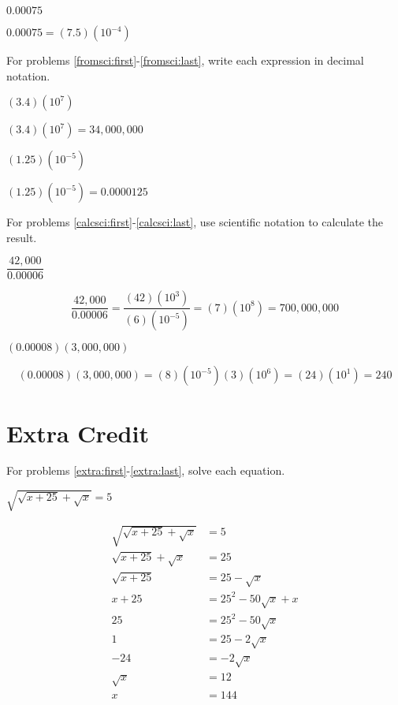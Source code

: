 \documentclass[fleqn,addpoints]{exam}
\begin{document}
\begin{questions}
\question[3] \( 0.00075 \)
\label{tosci:last}
\begin{solution}[1 cm]
\( 0.00075 = (7.5)(10^{-4}) \)
\end{solution}

For problems \ref{fromsci:first}-\ref{fromsci:last}, write each expression in decimal notation.

\question[3] \( (3.4)(10^7) \)
\label{fromsci:first}
\begin{solution}[1 cm]
  \( (3.4)(10^7) = 34,000,000 \)
\end{solution}

\question[3] \( (1.25)(10^{-5}) \)
\label{fromsci:last}
\begin{solution}[1 cm]
\( (1.25)(10^{-5}) = 0.0000125 \)
\end{solution}

For problems \ref{calcsci:first}-\ref{calcsci:last}, use scientific notation to calculate the result.

\question[5] \( \dfrac{42,000}{0.00006} \)
\label{calcsci:first}
\begin{solution}[4 cm]
\[
  \frac{42,000}{0.00006} = \frac{(42)(10^3)}{(6)(10^{-5})} = (7)(10^8) = 700,000,000
\]
\end{solution}

\question[5] \( (0.00008)(3,000,000) \)
\label{calcsci:last}
\begin{solution}[4 cm]
\[
  (0.00008)(3,000,000) = (8)(10^{-5}) (3)(10^6) = (24)(10^1) = 240
\]
\end{solution}

\pagebreak

\noaddpoints

\section{Extra Credit}

For problems \ref{extra:first}-\ref{extra:last}, solve each equation.

\question[7]
\label{extra:first} \( \sqrt{ \sqrt{x+25} + \sqrt{x}} = 5 \) 
\begin{solution}[9 cm]
\begin{align*}
  \sqrt{ \sqrt{x+25} + \sqrt{x}} &= 5 \\
  \sqrt{x+25} + \sqrt{x} &= 25 \\
  \sqrt{x+25}  &= 25 - \sqrt{x} \\
  x + 25  &= 25^2 - 50\sqrt{x} + x \\
  25  &= 25^2 - 50\sqrt{x} \\
  1  &= 25 - 2\sqrt{x} \\
  -24  &= -2\sqrt{x} \\
  \sqrt{x} &= 12 \\
  x &= 144 \\
\end{align*}


\end{solution}
\end{questions}
\end{document}
